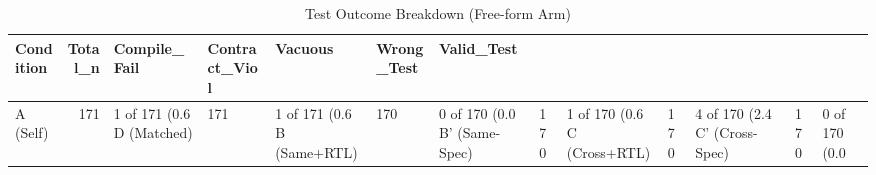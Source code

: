 \begin{table}
\caption{Test Outcome Breakdown (Free-form Arm)}
\label{tab:outcomes_freeform}
\begin{tabular}{lrlllll}
\toprule
Condition & Total_n & Compile_Fail & Contract_Viol & Vacuous & Wrong_Test & Valid_Test \\
\midrule
A (Self) & 171 & 1 of 171 (0.6%
D (Matched) & 171 & 1 of 171 (0.6%
B (Same+RTL) & 170 & 0 of 170 (0.0%
B' (Same-Spec) & 170 & 1 of 170 (0.6%
C (Cross+RTL) & 170 & 4 of 170 (2.4%
C' (Cross-Spec) & 170 & 0 of 170 (0.0%
\bottomrule
\end{tabular}
\end{table}
